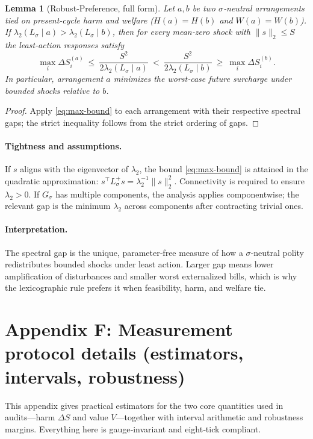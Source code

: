 \documentclass[11pt]{article}
\newtheorem{lemma}[theorem]{Lemma}
\begin{document}
\begin{lemma}[Robust‑Preference, full form]
Let $a,b$ be two $\sigma$‑neutral arrangements tied on present‑cycle harm and welfare ($H(a)=H(b)$ and $W(a)=W(b)$). If $\lambda_2(L_\sigma\!\mid a)>\lambda_2(L_\sigma\!\mid b)$, then for every mean‑zero shock with $\|s\|_2\le S$ the least‑action responses satisfy
\[
\max_i \Delta S_i^{(a)} \ \le\ \frac{S^2}{2\lambda_2(L_\sigma\!\mid a)}\ <\ \frac{S^2}{2\lambda_2(L_\sigma\!\mid b)}\ \ge\ \max_i \Delta S_i^{(b)}.
\]
In particular, arrangement $a$ minimizes the worst‑case future surcharge under bounded shocks relative to $b$.
\end{lemma}

\begin{proof}
Apply \eqref{eq:max-bound} to each arrangement with their respective spectral gaps; the strict inequality follows from the strict ordering of gaps.
\end{proof}

\paragraph{Tightness and assumptions.}
If $s$ aligns with the eigenvector of $\lambda_2$, the bound \eqref{eq:max-bound} is attained in the quadratic approximation: $s^\top L_\sigma^{+} s=\lambda_2^{-1}\|s\|_2^2$. Connectivity is required to ensure $\lambda_2>0$. If $G_\sigma$ has multiple components, the analysis applies componentwise; the relevant gap is the minimum $\lambda_2$ across components after contracting trivial ones.

\paragraph{Interpretation.}
The spectral gap is the unique, parameter‑free measure of how a $\sigma$‑neutral polity redistributes bounded shocks under least action. Larger gap means lower amplification of disturbances and smaller worst externalized bills, which is why the lexicographic rule prefers it when feasibility, harm, and welfare tie.

\section{Appendix F: Measurement protocol details (estimators, intervals, robustness)}

This appendix gives practical estimators for the two core quantities used in audits—harm $\Delta S$ and value $V$—together with interval arithmetic and robustness margins. Everything here is gauge‑invariant and eight‑tick compliant.
\end{document}
